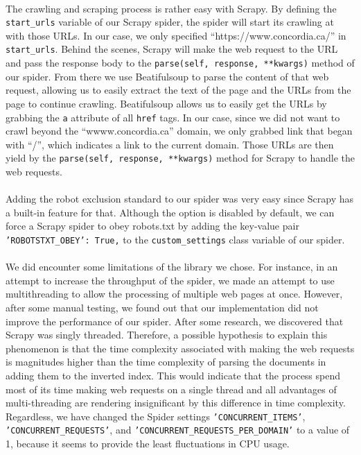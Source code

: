 \documentclass[]{article}
\begin{document}
\paragraph{}
The crawling and scraping process is rather easy with Scrapy. By defining the \texttt{start_urls} variable of our Scrapy spider, the spider will start its crawling at with those URLs. In our case, we only specified ``https://www.concordia.ca/'' in \texttt{start_urls}. Behind the scenes, Scrapy will make the web request to the URL and pass the response body to the \texttt{parse(self, response, **kwargs)} method of our spider. From there we use Beatifulsoup to parse the content of that web request, allowing us to easily extract the text of the page and the URLs from the page to continue crawling. Beatifulsoup allows us to easily get the URLs by grabbing the \texttt{a} attribute of all \texttt{href} tags. In our case, since we did not want to crawl beyond the ``wwww.concordia.ca'' domain, we only grabbed link that began with ``/'', which indicates a link to the current domain. Those URLs are then yield by the \texttt{parse(self, response, **kwargs)} method for Scrapy to handle the web requests.

\paragraph{}
Adding the robot exclusion standard to our spider was very easy since Scrapy has a built-in feature for that. Although the option is disabled by default, we can force a Scrapy spider to obey robots.txt by adding the key-value pair \texttt{'ROBOTSTXT_OBEY': True,} to the \texttt{custom_settings} class variable of our spider.

\paragraph{}
We did encounter some limitations of the library we chose. For instance, in an attempt to increase the throughput of the spider, we made an attempt to use multithreading to allow the processing of multiple web pages at once. However, after some manual testing, we found out that our implementation did not improve the performance of our spider. After some research, we discovered that Scrapy was singly threaded. Therefore, a possible hypothesis to explain this phenomenon is that the time complexity associated with making the web requests is magnitudes higher than the time complexity of parsing the documents in adding them to the inverted index. This would indicate that the process spend most of its time making web requests on a single thread and all advantages of multi-threading are rendering insignificant by this difference in time complexity. Regardless, we have changed the Spider settings \texttt{'CONCURRENT_ITEMS'}, \texttt{'CONCURRENT_REQUESTS'}, and \texttt{'CONCURRENT_REQUESTS_PER_DOMAIN'} to a value of 1, because it seems to provide the least fluctuations in CPU usage.
\end{document}
